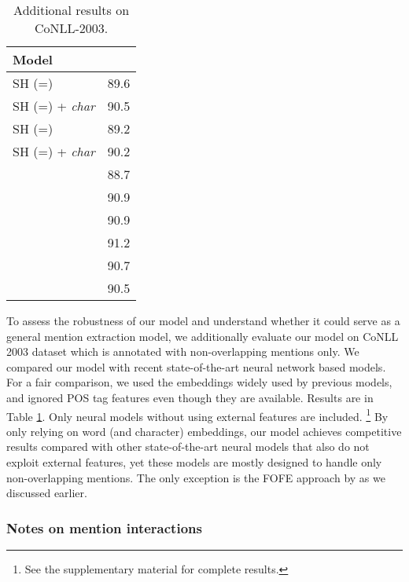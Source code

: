 \documentclass[11pt,a4paper]{article}
\theoremstyle{theorem}
\begin{document}
\begin{table}[t!]
\centering
\scalebox{0.9}
{
\begin{tabular}{l|c}
Model &  \\
  \hline
  
SH (=)   & 89.6      \\
SH (=) + \textit{char}   & 90.5      \\
SH (=)   & 89.2       \\
SH (=)  + \textit{char}  & 90.2     \\
\hdashline
\citet{collobert2011natural} & 88.7 \\
\citet{chiu2016named} & 90.9 \\
\citet{lample2016neural}& 90.9\\
\citet{ma-hovy:2016:P16-1} & 91.2 \\
\citet{xu2017local} & 90.7 \\
\citet{strubell2017fast} & 90.5
\end{tabular}
}
\caption{Additional results on CoNLL-2003.}
\label{tab:ner-conll}
\end{table}

To assess the robustness of our model and understand whether it could serve as a general mention extraction model,
we additionally evaluate our model on CoNLL 2003  dataset which is annotated with non-overlapping mentions only.
We compared our model with recent state-of-the-art neural network based models.
For a fair comparison, we used the  embeddings widely used by previous models, and ignored POS tag features even though they are available.
Results are  in Table \ref{tab:ner-conll}. Only neural models without using external features are included. 
\footnote{See the supplementary material for complete results.}
By only relying on word (and character) embeddings, our model achieves competitive results compared with other state-of-the-art neural models that also do not exploit external features, 
yet these models are mostly designed to handle only non-overlapping mentions.
The only exception is the FOFE approach by \cite{xu2017local} as we discussed earlier.


\subsubsection*{Notes on mention interactions}
\end{document}
